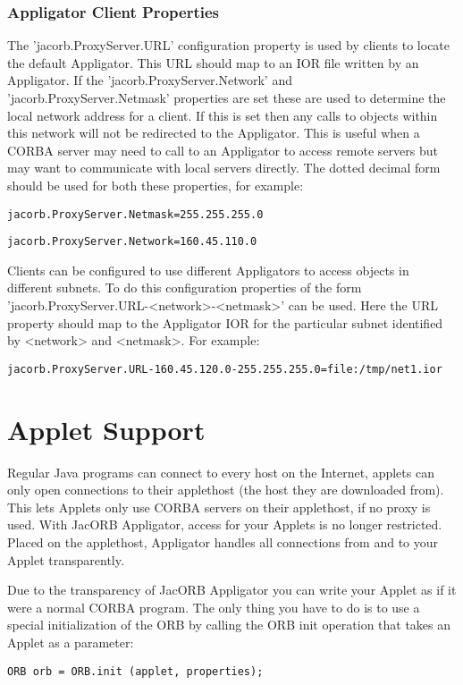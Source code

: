 \subsubsection{Appligator Client Properties}

The 'jacorb.ProxyServer.URL' configuration property is used
by clients to locate the default Appligator. This URL should map to an
IOR file written by an Appligator.  If the
'jacorb.ProxyServer.Network' and 'jacorb.ProxyServer.Netmask'
properties are set these are used to determine the local network
address for a client. If this is set then any calls to objects within
this network will not be redirected to the Appligator. This is useful
when a CORBA server may need to call to an Appligator to access remote
servers but may want to communicate with local servers directly. The
dotted decimal form should be used for both these properties, for
example:

\verb+jacorb.ProxyServer.Netmask=255.255.255.0+

\verb+jacorb.ProxyServer.Network=160.45.110.0+

Clients can be configured to use different Appligators to access
objects in different subnets. To do this configuration properties of
the form 'jacorb.ProxyServer.URL-<network>-<netmask>' can be
used. Here the URL property should map to the Appligator IOR for the
particular subnet identified by <network> and <netmask>. For example:

\verb+jacorb.ProxyServer.URL-160.45.120.0-255.255.255.0=file:/tmp/net1.ior+

\section{Applet Support}

Regular Java programs can connect to every host on the Internet,
applets can only open connections to their applethost (the host they
are downloaded from). This lets Applets only use CORBA servers on
their applethost, if no proxy is used. With JacORB Appligator, access
for your Applets is no longer restricted. Placed on the applethost,
Appligator handles all connections from and to your Applet
transparently.

Due to the transparency of JacORB Appligator you can write your Applet
as if it were a normal CORBA program. The only thing you have to do is
to use a special initialization of the ORB by calling the ORB init
operation that takes an Applet as a parameter:

\verb+ORB orb = ORB.init (applet, properties);+

